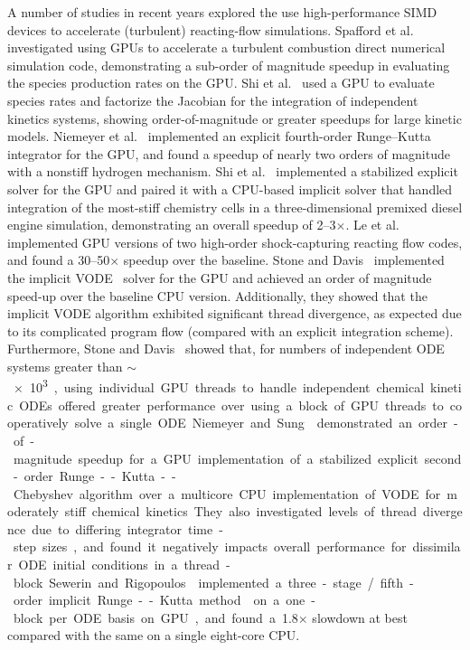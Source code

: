 \documentclass[final,twocolumn]{elsarticle}
\begin{document}
A number of studies in recent years explored the use high-performance SIMD devices to accelerate (turbulent) reacting-flow simulations.
Spafford et al.~\cite{Spafford:2010aa} investigated using GPUs to accelerate a turbulent combustion direct numerical simulation code, demonstrating a sub-order of magnitude speedup in evaluating the species production rates on the GPU.
Shi et al.~\cite{Shi:2011aa} used a GPU to evaluate species rates and factorize the Jacobian for the integration of independent kinetics systems, showing order-of-magnitude or greater speedups for large kinetic models.
Niemeyer et al.~\cite{Niemeyer:2011aa} implemented an explicit fourth-order Runge--Kutta integrator for the GPU, and found a speedup of nearly two orders of magnitude with a nonstiff hydrogen mechanism.
Shi et al.~\cite{Shi:2012aa} implemented a stabilized explicit solver for the GPU and paired it with a CPU-based implicit solver that handled integration of the most-stiff chemistry cells in a three-dimensional premixed diesel engine simulation, demonstrating an overall speedup of \numrange{2}{3}$\times$.
Le et al.~\cite{Le2013596} implemented GPU versions of two high-order shock-capturing reacting flow codes, and found a \numrange{30}{50}$\times$ speedup over the baseline.
Stone and Davis~\cite{Stone:2013aa} implemented the implicit VODE~\cite{Brown:1989vl} solver for the GPU and achieved an order of magnitude speed-up over the baseline CPU version.
Additionally, they showed that the implicit VODE algorithm exhibited significant thread divergence, as expected due to its complicated program flow (compared with an explicit integration scheme).
Furthermore, Stone and Davis~\cite{Stone:2013aa} showed that, for numbers of independent ODE systems greater than $\sim$\SI{e3}, using individual GPU threads to handle independent chemical kinetic ODEs offered greater performance over using a block of GPU threads to cooperatively solve a single ODE.
Niemeyer and Sung~\cite{Niemeyer:2014aa} demonstrated an order-of-magnitude speedup for a GPU implementation of a stabilized explicit second-order Runge--Kutta--Chebyshev algorithm over a multicore CPU implementation of VODE for moderately stiff chemical kinetics.
They also investigated levels of thread divergence due to differing integrator time-step sizes, and found it negatively impacts overall performance for dissimilar ODE initial conditions in a thread-block.
Sewerin and Rigopoulos~\cite{Sewerin20151375} implemented a three-stage\slash fifth-order implicit Runge--Kutta method~\cite{wanner1991solving} on a one-block per ODE basis on GPU, and found a \num{1.8}$\times$ slowdown at best compared with the same on a single eight-core CPU.
\end{document}

